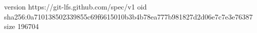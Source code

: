 version https://git-lfs.github.com/spec/v1
oid sha256:0a710138502339855c69f6615010b3b4b78ea777b981827d2d06e7c7e3e76387
size 196704
